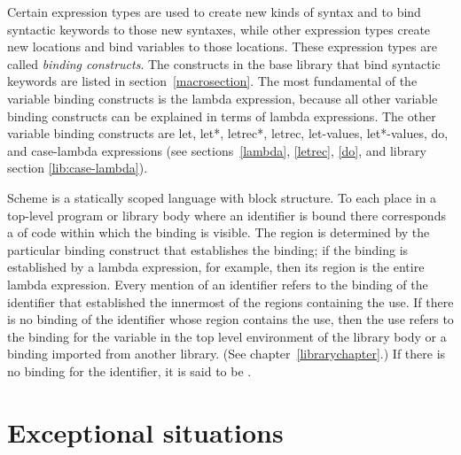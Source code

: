 

\vest Certain expression types are used to create new kinds of syntax
and to bind syntactic keywords to those new syntaxes, while other
expression types create new locations and bind variables to those
locations.  These expression types are called {\em binding constructs}.
The constructs in the base library that bind syntactic keywords are listed in section~\ref{macrosection}.
The most fundamental of the variable binding constructs is the
{\cf lambda} expression, because all other variable binding constructs
can be explained in terms of {\cf lambda} expressions.  The other
variable binding constructs are {\cf let}, {\cf let*}, {\cf letrec*},
{\cf letrec}, {\cf let-values}, {\cf let*-values}, {\cf do}, and {\cf
  case-lambda} expressions (see sections~\ref{lambda}, \ref{letrec}, 
\ref{do}, and library section \ref{lib:case-lambda}).


\vest Scheme is a statically scoped language with
block structure.  To each place in a top-level program or library body where an identifier is bound 
there corresponds a  of code within which
the binding is visible.  The region is determined by the particular
binding construct that establishes the binding; if the binding is
established by a {\cf lambda} expression, for example, then its region
is the entire {\cf lambda} expression.  Every mention of an identifier
refers to the binding of the identifier that established the
innermost of the regions containing the use.  If there is no binding of
the identifier whose region contains the use, then the use refers to the
binding for the variable in the top level environment of the library
body or a binding imported from another library.  (See
chapter~\ref{librarychapter}.)
If there is no binding for the identifier,
it is said to be .

\section{Exceptional situations}
\label{exceptionalsituationsection}

